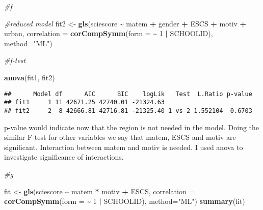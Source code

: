 \documentclass[
]{article}
\newenvironment{Shaded}{\begin{snugshade}}{\end{snugshade}}
\newcommand{\AttributeTok}[1]{\textcolor[rgb]{0.13,0.29,0.53}{#1}}
\newcommand{\CommentTok}[1]{\textcolor[rgb]{0.56,0.35,0.01}{\textit{#1}}}
\newcommand{\DecValTok}[1]{\textcolor[rgb]{0.00,0.00,0.81}{#1}}
\newcommand{\FunctionTok}[1]{\textcolor[rgb]{0.13,0.29,0.53}{\textbf{#1}}}
\newcommand{\NormalTok}[1]{#1}
\newcommand{\OtherTok}[1]{\textcolor[rgb]{0.56,0.35,0.01}{#1}}
\newcommand{\SpecialCharTok}[1]{\textcolor[rgb]{0.81,0.36,0.00}{\textbf{#1}}}
\newcommand{\StringTok}[1]{\textcolor[rgb]{0.31,0.60,0.02}{#1}}
\begin{document}
\begin{Shaded}
\begin{Highlighting}[]
\CommentTok{\#f}

\CommentTok{\#reduced model}
\NormalTok{fit2 }\OtherTok{\textless{}{-}} \FunctionTok{gls}\NormalTok{(sciescore }\SpecialCharTok{\textasciitilde{}}\NormalTok{ matem }\SpecialCharTok{+}\NormalTok{ gender }\SpecialCharTok{+}\NormalTok{ ESCS }\SpecialCharTok{+}\NormalTok{ motiv }\SpecialCharTok{+}\NormalTok{ urban,}
            \AttributeTok{correlation =} \FunctionTok{corCompSymm}\NormalTok{(}\AttributeTok{form =} \SpecialCharTok{\textasciitilde{}} \DecValTok{1} \SpecialCharTok{|}\NormalTok{ SCHOOLID),}
            \AttributeTok{method=}\StringTok{"ML"}\NormalTok{)}

\CommentTok{\#f{-}test}

\FunctionTok{anova}\NormalTok{(fit1, fit2)}
\end{Highlighting}
\end{Shaded}

\begin{verbatim}
##      Model df      AIC      BIC    logLik   Test  L.Ratio p-value
## fit1     1 11 42671.25 42740.01 -21324.63                        
## fit2     2  8 42666.81 42716.81 -21325.40 1 vs 2 1.552104  0.6703
\end{verbatim}

p-value would indicate now that the region is not needed in the model.
Doing the similar F-test for other variables we say that matem, ESCS and
motiv are significant. Interaction between matem and motiv is needed. I
used anova to investigate significance of interactions.

\begin{Shaded}
\begin{Highlighting}[]
\CommentTok{\#g}

\NormalTok{fit }\OtherTok{\textless{}{-}} \FunctionTok{gls}\NormalTok{(sciescore }\SpecialCharTok{\textasciitilde{}}\NormalTok{ matem }\SpecialCharTok{*}\NormalTok{ motiv }\SpecialCharTok{+}\NormalTok{ ESCS,}
            \AttributeTok{correlation =} \FunctionTok{corCompSymm}\NormalTok{(}\AttributeTok{form =} \SpecialCharTok{\textasciitilde{}} \DecValTok{1} \SpecialCharTok{|}\NormalTok{ SCHOOLID),}
            \AttributeTok{method=}\StringTok{"ML"}\NormalTok{)}
\FunctionTok{summary}\NormalTok{(fit)}
\end{Highlighting}
\end{Shaded}
\end{document}
